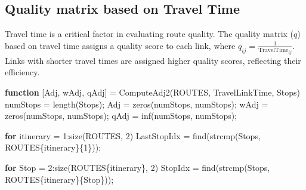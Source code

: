\documentclass[
  letterpaper,
  DIV=11,
  numbers=noendperiod]{scrartcl}
\newenvironment{Shaded}{\begin{snugshade}}{\end{snugshade}}
\newcommand{\FloatTok}[1]{\textcolor[rgb]{0.68,0.00,0.00}{#1}}
\newcommand{\KeywordTok}[1]{\textcolor[rgb]{0.00,0.23,0.31}{\textbf{#1}}}
\newcommand{\NormalTok}[1]{\textcolor[rgb]{0.00,0.23,0.31}{#1}}
\newcommand{\OperatorTok}[1]{\textcolor[rgb]{0.37,0.37,0.37}{#1}}
\newcommand{\VariableTok}[1]{\textcolor[rgb]{0.07,0.07,0.07}{#1}}
\begin{document}
\subsection{Quality matrix based on Travel
Time}\label{quality-matrix-based-on-travel-time}

Travel time is a critical factor in evaluating route quality. The
quality matrix (\(q\)) based on travel time assigns a quality score to
each link, where \(q_{ij} = \frac{1}{\text{TravelTime}_{ij}}\). Links
with shorter travel times are assigned higher quality scores, reflecting
their efficiency.

\begin{Shaded}
\begin{Highlighting}[]
\KeywordTok{function}\NormalTok{ [}\VariableTok{Adj}\OperatorTok{,} \VariableTok{wAdj}\OperatorTok{,} \VariableTok{qAdj}\NormalTok{] }\OperatorTok{=} \VariableTok{ComputeAdj2}\NormalTok{(}\VariableTok{ROUTES}\OperatorTok{,} \VariableTok{TravelLinkTime}\OperatorTok{,} \VariableTok{Stops}\NormalTok{)}
    \VariableTok{numStops} \OperatorTok{=} \VariableTok{length}\NormalTok{(}\VariableTok{Stops}\NormalTok{)}\OperatorTok{;}
    \VariableTok{Adj} \OperatorTok{=} \VariableTok{zeros}\NormalTok{(}\VariableTok{numStops}\OperatorTok{,} \VariableTok{numStops}\NormalTok{)}\OperatorTok{;}
    \VariableTok{wAdj} \OperatorTok{=} \VariableTok{zeros}\NormalTok{(}\VariableTok{numStops}\OperatorTok{,} \VariableTok{numStops}\NormalTok{)}\OperatorTok{;}
    \VariableTok{qAdj} \OperatorTok{=} \VariableTok{inf}\NormalTok{(}\VariableTok{numStops}\OperatorTok{,} \VariableTok{numStops}\NormalTok{)}\OperatorTok{;}

    \KeywordTok{for} \VariableTok{itinerary} \OperatorTok{=} \FloatTok{1}\OperatorTok{:}\VariableTok{size}\NormalTok{(}\VariableTok{ROUTES}\OperatorTok{,} \FloatTok{2}\NormalTok{)}
        \VariableTok{LastStopIdx} \OperatorTok{=} \VariableTok{find}\NormalTok{(}\VariableTok{strcmp}\NormalTok{(}\VariableTok{Stops}\OperatorTok{,} \VariableTok{ROUTES}\NormalTok{\{}\VariableTok{itinerary}\NormalTok{\}\{}\FloatTok{1}\NormalTok{\}))}\OperatorTok{;}

        \KeywordTok{for} \VariableTok{Stop} \OperatorTok{=} \FloatTok{2}\OperatorTok{:}\VariableTok{size}\NormalTok{(}\VariableTok{ROUTES}\NormalTok{\{}\VariableTok{itinerary}\NormalTok{\}}\OperatorTok{,} \FloatTok{2}\NormalTok{)}
            \VariableTok{StopIdx} \OperatorTok{=} \VariableTok{find}\NormalTok{(}\VariableTok{strcmp}\NormalTok{(}\VariableTok{Stops}\OperatorTok{,} \VariableTok{ROUTES}\NormalTok{\{}\VariableTok{itinerary}\NormalTok{\}\{}\VariableTok{Stop}\NormalTok{\}))}\OperatorTok{;}


\end{Highlighting}
\end{Shaded}
\end{document}
